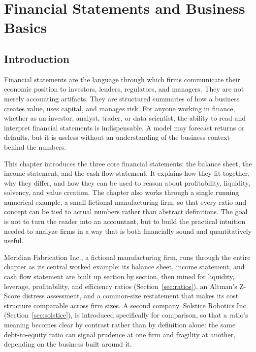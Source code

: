 \documentclass[../ai_in_finance]{subfiles}
\begin{document}
\chapter{Financial Statements and Business Basics}

\section{Introduction}

Financial statements are the language through which firms communicate their economic position to investors, lenders, regulators, and managers. They are not merely accounting artifacts. They are structured summaries of how a business creates value, uses capital, and manages risk. For anyone working in finance, whether as an investor, analyst, trader, or data scientist, the ability to read and interpret financial statements is indispensable. A model may forecast returns or defaults, but it is useless without an understanding of the business context behind the numbers.

This chapter introduces the three core financial statements: the balance sheet, the income statement, and the cash flow statement. It explains how they fit together, why they differ, and how they can be used to reason about profitability, liquidity, solvency, and value creation. The chapter also works through a single running numerical example, a small fictional manufacturing firm, so that every ratio and concept can be tied to actual numbers rather than abstract definitions. The goal is not to turn the reader into an accountant, but to build the practical intuition needed to analyze firms in a way that is both financially sound and quantitatively useful.

Meridian Fabrication Inc., a fictional manufacturing firm, runs through the entire chapter as its central worked example: its balance sheet, income statement, and cash flow statement are built up section by section, then mined for liquidity, leverage, profitability, and efficiency ratios (Section~\ref{sec:ratios}), an Altman's Z-Score distress assessment, and a common-size restatement that makes its cost structure comparable across firm sizes. A second company, Solstice Robotics Inc. (Section~\ref{sec:solstice}), is introduced specifically for comparison, so that a ratio's meaning becomes clear by contrast rather than by definition alone: the same debt-to-equity ratio can signal prudence at one firm and fragility at another, depending on the business built around it.
\end{document}
